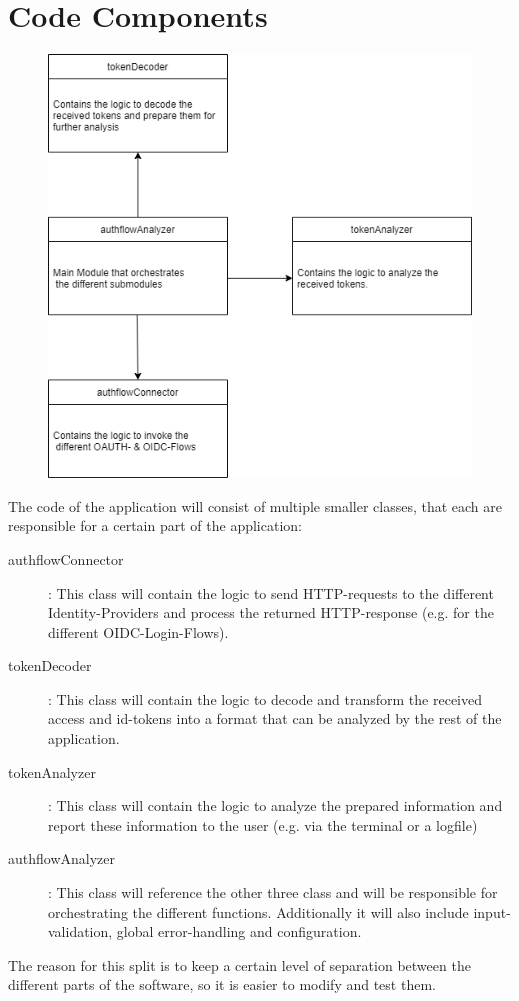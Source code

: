 \documentclass[12pt, a4paper]{article}
\begin{document}
\newpage
\section{Code Components}
\begin{figure}[!h]
    \centering
    \includegraphics[width=\textwidth]{Code-Components}
\end{figure}

\noindent The code of the application will consist of multiple smaller classes, that each are responsible for a certain part of the application:
\begin{description}
\item[authflowConnector]: This class will contain the logic to send HTTP-requests to the different Identity-Providers and process the returned HTTP-response (e.g. for the different OIDC-Login-Flows).
\item[tokenDecoder]: This class will contain the logic to decode and transform the received access and id-tokens into a format that can be analyzed by the rest of the application.
\item[tokenAnalyzer]: This class will contain the logic to analyze the prepared information and report these information to the user (e.g. via the terminal or a logfile)
\item[authflowAnalyzer]: This class will reference the other three class and will be responsible for orchestrating the different functions. Additionally it will also include input-validation, global error-handling and configuration.
\end{description}
The reason for this split is to keep a certain level of separation between the different parts of the software, so it is easier to modify and test them.
\end{document}
